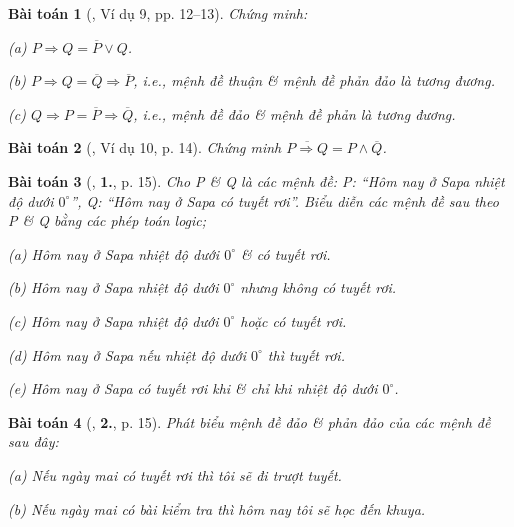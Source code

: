 \documentclass{article}
\numberwithin{equation}{section}
\newtheorem{baitoan}{Bài toán}[section]
\begin{document}
\begin{baitoan}[\cite{TL_chuyen_Toan_Dai_So_10}, Ví dụ 9, pp. 12--13]
	Chứng minh:
	\begin{enumerate*}
		\item[(a)] $P\Rightarrow Q = \overline{P}\lor Q$.
		\item[(b)] $P\Rightarrow Q = \overline{Q}\Rightarrow\overline{P}$, i.e., mệnh đề thuận \& mệnh đề phản đảo là tương đương.
		\item[(c)] $Q\Rightarrow P = \overline{P}\Rightarrow\overline{Q}$, i.e., mệnh đề đảo \& mệnh đề phản là tương đương.
	\end{enumerate*}
\end{baitoan}

\begin{baitoan}[\cite{TL_chuyen_Toan_Dai_So_10}, Ví dụ 10, p. 14]
	Chứng minh $\overline{P\Rightarrow Q} = P\land\overline{Q}$.
\end{baitoan}

\begin{baitoan}[\cite{TL_chuyen_Toan_Dai_So_10}, \textbf{1.}, p. 15]
	Cho P \& Q là các mệnh đề: P: ``Hôm nay ở Sapa nhiệt độ dưới $0^\circ$'', Q: ``Hôm nay ở Sapa có tuyết rơi''. Biểu diễn các mệnh đề sau theo P \& Q bằng các phép toán logic;
	\begin{enumerate*}
		\item[(a)] Hôm nay ở Sapa nhiệt độ dưới $0^\circ$ \& có tuyết rơi.
		\item[(b)] Hôm nay ở Sapa nhiệt độ dưới $0^\circ$ nhưng không có tuyết rơi.
		\item[(c)] Hôm nay ở Sapa nhiệt độ dưới $0^\circ$ hoặc có tuyết rơi.
		\item[(d)] Hôm nay ở Sapa nếu nhiệt độ dưới $0^\circ$ thì tuyết rơi.
		\item[(e)] Hôm nay ở Sapa có tuyết rơi khi \& chỉ khi nhiệt độ dưới $0^\circ$.
	\end{enumerate*}
\end{baitoan}

\begin{baitoan}[\cite{TL_chuyen_Toan_Dai_So_10}, \textbf{2.}, p. 15]
	Phát biểu mệnh đề đảo \& phản đảo của các mệnh đề sau đây:
	\begin{enumerate*}
		\item[(a)] Nếu ngày mai có tuyết rơi thì tôi sẽ đi trượt tuyết.
		\item[(b)] Nếu ngày mai có bài kiểm tra thì hôm nay tôi sẽ học đến khuya.
	\end{enumerate*}
\end{baitoan}
\end{document}
